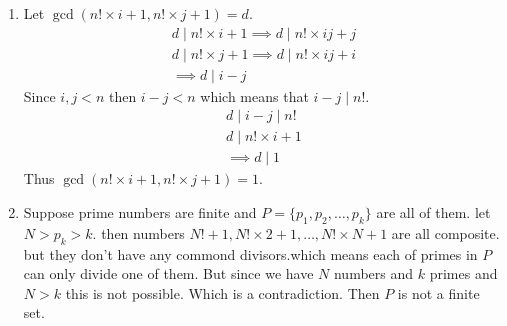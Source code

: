 \begin{enumerate}[label=\textbf{(\textit{\roman*})}]
    \item  
        Let $\gcd(n! \times i + 1, n! \times j + 1) = d$.
        \begin{gather*}
            d \mid n! \times i + 1 \implies d \mid n! \times ij + j \\
            d \mid n! \times j + 1 \implies d \mid n! \times ij + i \\
            \implies d \mid i - j
        \end{gather*}
        Since $i, j < n$ then $i - j < n$ which means that $i - j \mid n!$.
        \begin{gather*}
            d \mid i - j \mid n!\\
            d \mid n! \times i + 1 \\
            \implies d \mid 1
        \end{gather*}
        Thus $\gcd(n! \times i + 1, n! \times j + 1) = 1$.
    \item   
        Suppose prime numbers are finite and $P=\{p_1, p_2, \dots, p_k\}$ are all of them. let $N > p_k > k$.
        then numbers $N! + 1, N! \times 2 + 1, \dots , N! \times N + 1$  are all composite. but they don't have any commond divisors.which means each of primes in $P$ can only divide one of them. But since we have $N$ numbers and $k$ primes and $N > k$ this is not possible. Which is a contradiction. Then $P$ is not a finite set.
\end{enumerate}